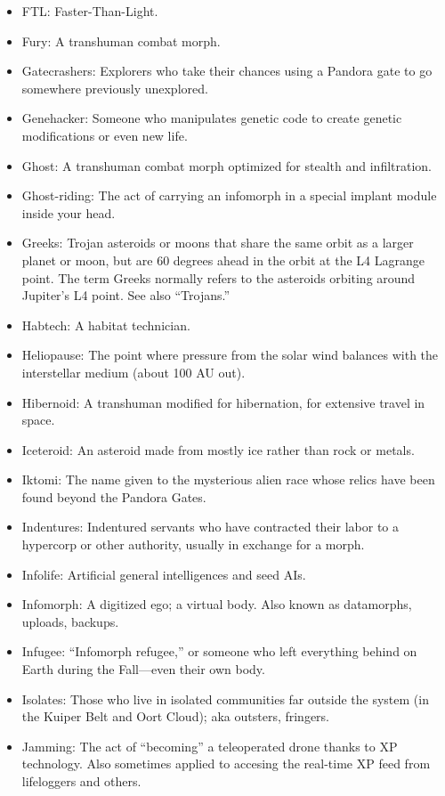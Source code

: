 \begin{itemize}
\item FTL: Faster-Than-Light.
\item Fury: A transhuman combat morph.
\item Gatecrashers: Explorers who take their chances using a Pandora  gate to go somewhere previously unexplored.
\item Genehacker: Someone who manipulates genetic code to create  genetic modifications or even new life.
\item Ghost: A transhuman combat morph optimized for stealth and  infiltration.
\item Ghost-riding: The act of carrying an infomorph in a special  implant module inside your head.
\item Greeks: Trojan asteroids or moons that share the same orbit as a  larger planet or moon, but are 60 degrees ahead in the orbit at the  L4 Lagrange point. The term Greeks normally refers to the asteroids  orbiting around Jupiter's L4 point. See also ``Trojans.''
\item Habtech: A habitat technician.
\item Heliopause: The point where pressure from the solar wind  balances with the interstellar medium (about 100 AU out).
\item Hibernoid: A transhuman modified for hibernation, for extensive  travel in space.
\item Iceteroid: An asteroid made from mostly ice rather than rock or  metals.
\item Iktomi: The name given to the mysterious alien race whose relics  have been found beyond the Pandora Gates.
\item Indentures: Indentured servants who have contracted their labor  to a hypercorp or other authority, usually in exchange for a morph.
\item Infolife: Artificial general intelligences and seed AIs.
\item Infomorph: A digitized ego; a virtual body. Also known as  datamorphs, uploads, backups.
\item Infugee: ``Infomorph refugee,'' or someone who left everything  behind on Earth during the Fall—even their own body.
\item Isolates: Those who live in isolated communities far outside the  system (in the Kuiper Belt and Oort Cloud); aka outsters, fringers.
\item Jamming: The act of ``becoming'' a teleoperated drone thanks to XP  technology. Also sometimes applied to accesing the real-time XP feed  from lifeloggers and others.

\end{itemize}
